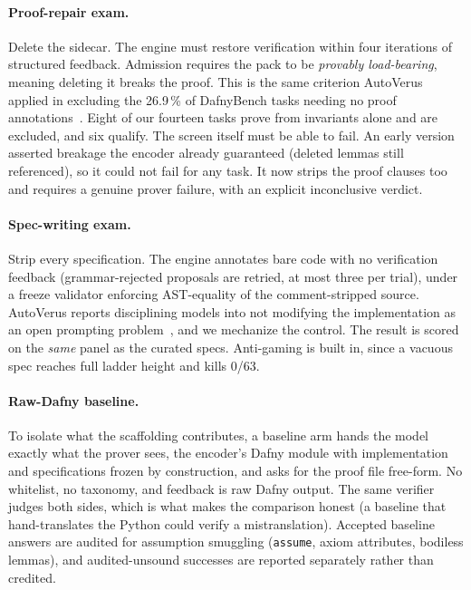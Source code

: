 \documentclass{article}
\begin{document}
\paragraph{Proof-repair exam.} Delete the sidecar. The engine must restore
verification within four iterations of structured feedback. Admission
requires the pack to be \emph{provably load-bearing}, meaning deleting it
breaks the proof. This is the same criterion AutoVerus applied in
excluding the 26.9\,\% of DafnyBench tasks needing no proof
annotations~\cite{autoverus}. Eight of our fourteen tasks prove from
invariants alone and are excluded, and six qualify. The screen itself must
be able to fail. An early version asserted breakage the encoder already
guaranteed (deleted lemmas still referenced), so it could not fail for any
task. It now strips the proof clauses too and requires a genuine prover
failure, with an explicit inconclusive verdict.

\paragraph{Spec-writing exam.} Strip every specification. The engine
annotates bare code with no verification feedback (grammar-rejected
proposals are retried, at most three per trial), under a freeze validator
enforcing AST-equality of the comment-stripped source. AutoVerus reports
disciplining models into not modifying the implementation as an open
prompting problem~\cite{autoverus}, and we mechanize the control. The
result is scored on the \emph{same} panel as the curated specs.
Anti-gaming is built in, since a vacuous spec reaches full ladder height
and kills 0/63.

\paragraph{Raw-Dafny baseline.} To isolate what the scaffolding
contributes, a baseline arm hands the model exactly what the prover sees,
the encoder's Dafny module with implementation and specifications frozen
by construction, and asks for the proof file free-form. No whitelist, no
taxonomy, and feedback is raw Dafny output. The same verifier judges both
sides, which is what makes the comparison honest (a baseline that
hand-translates the Python could verify a mistranslation). Accepted
baseline answers are audited for assumption smuggling (\texttt{assume},
axiom attributes, bodiless lemmas), and audited-unsound successes are
reported separately rather than credited.
\end{document}
